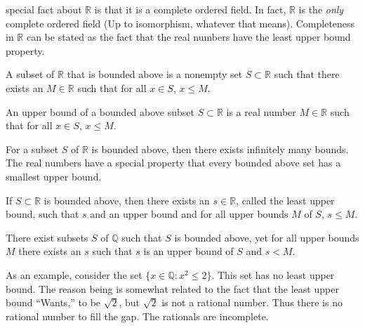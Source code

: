 \documentclass[crop=false,class=article,oneside]{standalone}
\begin{document}
            special fact about $\mathbb{R}$ is that it is a
            complete ordered field. In fact, $\mathbb{R}$ is the
            \textit{only} complete ordered field (Up to isomorphism,
            whatever that means). Completeness in $\mathbb{R}$ can
            be stated as the fact that the real numbers have the
            least upper bound property.
            \begin{definition}
                A subset of $\mathbb{R}$ that is bounded above is
                a nonempty set $S\subset{\mathbb{R}}$ such that
                there exists an $M\in\mathbb{R}$ such that for all
                $x\in{S}$, $x\leq{M}$.
            \end{definition}
            \begin{definition}
                An upper bound of a bounded above subset
                $S\subset\mathbb{R}$ is a real number $M\in\mathbb{R}$
                such that for all $x\in{S}$, $x\leq{M}$.
            \end{definition}
            For a subset $S$ of $\mathbb{R}$ is bounded above, then
            there exists infinitely many bounds. The real numbers
            have a special property that every bounded above set
            has a smallest upper bound.
            \begin{theorem}
                If $S\subset{\mathbb{R}}$ is bounded above, then
                there exists an $s\in\mathbb{R}$, called the least
                upper bound, such that $s$ and an upper bound
                and for all upper bounds $M$ of $S$, $s\leq{M}$.
            \end{theorem}
            \begin{theorem}
                There exist subsets $S$ of $\mathbb{Q}$ such that
                $S$ is bounded above, yet for all upper bounds
                $M$ there exists an $s$ such that $s$ is an upper
                bound of $S$ and $s<M$.
            \end{theorem}
            \begin{example}
                As an example, consider the set
                $\{x\in\mathbb{Q}:x^{2}\leq{2}\}$.
                This set has no least upper bound. The reason
                being is somewhat related to the fact that the
                least upper bound ``Wants,'' to be $\sqrt{2}$,
                but $\sqrt{2}$ is not a rational number. Thus
                there is no rational number to fill the gap.
                The rationals are incomplete.
            \end{example}
\end{document}
